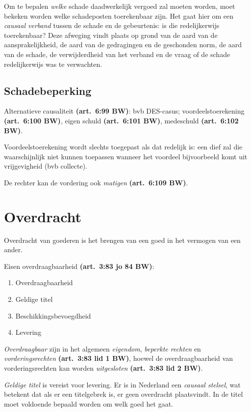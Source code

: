 \documentclass[a4paper]{article}
\newcommand{\art}[1]{\textbf{(art.~#1 BW)}\xspace}
\begin{document}
Om te bepalen \emph{welke} schade daadwerkelijk vergoed zal moeten worden,
moet bekeken worden welke schadeposten toerekenbaar zijn. Het gaat hier om een
\emph{causaal verband} tussen de schade en de gebeurtenis: is die
redelijkerwijs toerekenbaar? Deze afweging vindt plaats op grond van de aard
van de aansprakelijkheid, de aard van de gedragingen en de geschonden norm, de
aard van de schade, de verwijderdheid van het verband en de vraag of de schade
redelijkerwijs was te verwachten.

\subsection{Schadebeperking}

Alternatieve causaliteit \art{6:99}: bvb DES-casus; voordeelstoerekening
\art{6:100}, eigen schuld \art{6:101}, medeschuld \art{6:102}.

Voordeelstoerekening wordt slechts toegepast als dat redelijk is: een dief zal
die waarschijnlijk niet kunnen toepassen wanneer het voordeel bijvoorbeeld
komt uit vrijgevigheid (bvb collecte).

De rechter kan de vordering ook \emph{matigen} \art{6:109}.

\section{Overdracht}

Overdracht van goederen is het brengen van een goed in het vermogen van een
ander.

Eisen overdraagbaarheid \art{3:83 jo 84}:
\begin{enumerate}
  \item Overdraagbaarheid
  \item Geldige titel
  \item Beschikkingsbevoegdheid
  \item Levering
\end{enumerate}

\emph{Overdraagbaar} zijn in het algemeen \emph{eigendom}, \emph{beperkte
rechten} en \emph{vorderingsrechten} \art{3:83 lid 1}, hoewel de
overdraagbaarheid van vorderingsrechten kan worden \emph{uitgesloten}
\art{3:83 lid 2}.

\emph{Geldige titel} is vereist voor levering. Er is in Nederland een
\emph{causaal stelsel}, wat betekent dat als er een titelgebrek is, er geen
overdracht plaatsvindt. In de titel moet voldoende bepaald worden om welk goed
het gaat.
\end{document}
